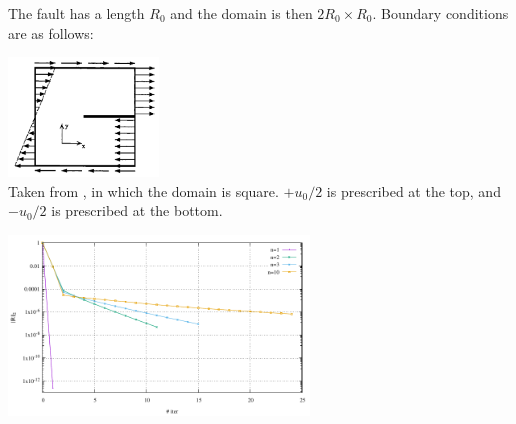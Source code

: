 The fault has a length $R_0$ and the domain is then $2R_0 \times R_0$. 
Boundary conditions are as follows:

\begin{center}
\includegraphics[width=4cm]{python_codes/fieldstone_87/images/baho92}\\
{\captionfont Taken from \cite{baho92}, in which the domain is square.
$+u_0/2$ is prescribed at the top, and $-u_0/2$ is prescribed at the bottom.
}
\end{center}




\begin{center}
\includegraphics[width=8cm]{python_codes/fieldstone_87/results/experiment_07/conv.pdf}
\end{center}


